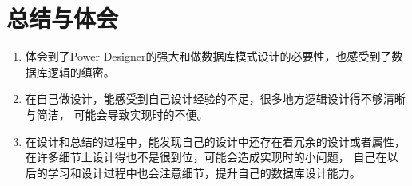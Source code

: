\documentclass{article}
\begin{document}
    \section{总结与体会}
    \begin{enumerate}[label=\arabic*.]
        \item 体会到了Power Designer的强大和做数据库模式设计的必要性，也感受到了数据库逻辑的缜密。
        \item 在自己做设计，能感受到自己设计经验的不足，很多地方逻辑设计得不够清晰与简洁，
        可能会导致实现时的不便。
        \item 在设计和总结的过程中，能发现自己的设计中还存在着冗余的设计或者属性，
        在许多细节上设计得也不是很到位，可能会造成实现时的小问题，
        自己在以后的学习和设计过程中也会注意细节，提升自己的数据库设计能力。
    \end{enumerate}
\end{document}

